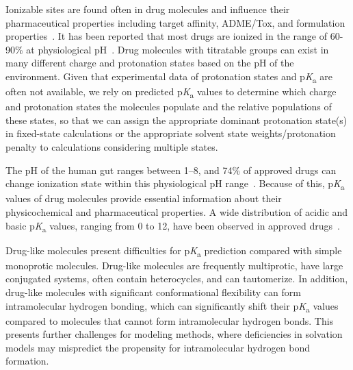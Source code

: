 \documentclass[9pt,lineno,final]{elife}
\newcommand{\pKa}{p\textit{K}\textsubscript{a}}
\begin{document}
Ionizable sites are found often in drug molecules and influence their pharmaceutical properties including target affinity, ADME/Tox, and formulation properties~\citep{Manallack:2013:ChemSocRev}. It has been reported that most drugs are ionized in the range of 60-90\% at physiological pH~\citep{Charifson:2014:J.Med.Chem.}.
Drug molecules with titratable groups can exist in many different charge and protonation states based on the pH of the environment. 
Given that experimental data of protonation states and \pKa{} are often not available, we rely on predicted \pKa{} values to determine which charge and protonation states the molecules populate and the relative populations of these states, so that we can assign the appropriate dominant protonation state(s) in fixed-state calculations or the appropriate solvent state weights/protonation penalty to calculations considering multiple states.

The pH of the human gut ranges between 1--8, and 74\% of approved drugs can change ionization state within this physiological pH range~\citep{Manallack:2013:ChemMedChema}. 
Because of this, \pKa{} values of drug molecules provide essential information about their physicochemical and pharmaceutical properties. 
A wide distribution of acidic and basic \pKa{} values, ranging from 0 to 12, have been observed in approved drugs~\citep{Manallack:2013:ChemMedChema, Manallack:2013:ChemSocRev}.

Drug-like molecules present difficulties for \pKa{} prediction compared with simple monoprotic molecules. 
Drug-like molecules are frequently multiprotic, have large conjugated systems, often contain heterocycles, and can tautomerize. 
In addition, drug-like molecules with significant conformational flexibility can form intramolecular hydrogen bonding, which can significantly shift their \pKa{} values compared to molecules that cannot form intramolecular hydrogen bonds. 
This presents further challenges for modeling methods, where deficiencies in solvation models may mispredict the propensity for intramolecular hydrogen bond formation. 
\end{document}
